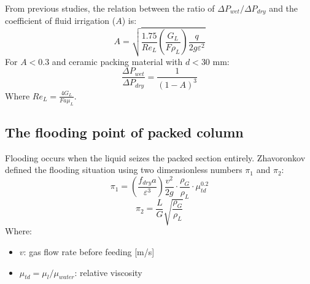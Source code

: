 From previous studies, the relation between the ratio of $\Delta P_{wet} / \Delta P_{dry}$ and the coefficient of fluid irrigation ($A$) is:
\begin{equation}
    A = \sqrt{\frac{1.75}{Re_L} \left( \frac{G_L}{F \rho_L} \right) \frac{q}{2g \varepsilon^2}}
\end{equation}
For $A < 0.3$ and ceramic packing material with $d < 30$ mm:
\begin{equation}
    \frac{\Delta P_{wet}}{\Delta P_{dry}} = \frac{1}{(1-A)^3}
\end{equation}
Where $Re_L = \frac{4G_L}{Fa \mu_L}$.

\subsection{The flooding point of packed column}
Flooding occurs when the liquid seizes the packed section entirely. Zhavoronkov defined the flooding situation using two dimensionless numbers $\pi_1$ and $\pi_2$:
\begin{equation}
    \pi_1 = \left( \frac{f_{dry} a}{\varepsilon^3} \right) \frac{v^2}{2g} \cdot \frac{\rho_G}{\rho_L} \cdot \mu_{td}^{0.2}
\end{equation}
\begin{equation}
    \pi_2 = \frac{L}{G} \sqrt{\frac{\rho_G}{\rho_L}}
\end{equation}
Where:
\begin{itemize}
    \item $v$: gas flow rate before feeding [m/s]
    \item $\mu_{td} = \mu_l / \mu_{water}$: relative viscosity
\end{itemize}
